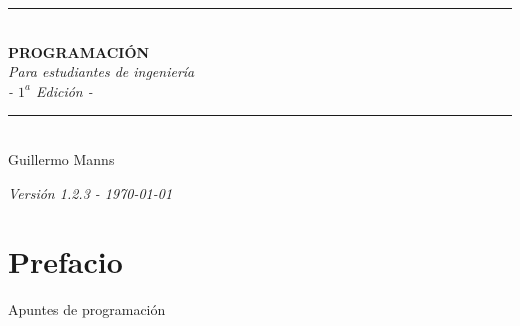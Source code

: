 \documentclass[12pt,openany]{book}
\begin{document}
\begin{titlepage}
    \begin{center}
        \vspace*{0.9cm}

        \rule{0.8\textwidth}{1.2pt}\\[0.7cm]

        {\Huge\bfseries\color{azulportada} PROGRAMACIÓN}\\[0.7cm]

        {\Large\itshape\color{azulportada} Para estudiantes de ingeniería}\\[0.7cm]

        {\Large\itshape - $1^{a}$ Edición -}\\[0.7cm]


        \rule{0.8\textwidth}{1.2pt}\\[1cm]

        {\huge Guillermo Manns}\\[0.5cm]

        \vspace{1cm}


    \end{center}
\end{titlepage}

\renewcommand{\contentsname}{Contenido}
\tableofcontents

\newpage
\begin{center}
    \vspace{1cm}
    \textit{Versión 1.2.3 - \today}
\end{center}

\chapter*{Prefacio}
Apuntes de programación
\end{document}
